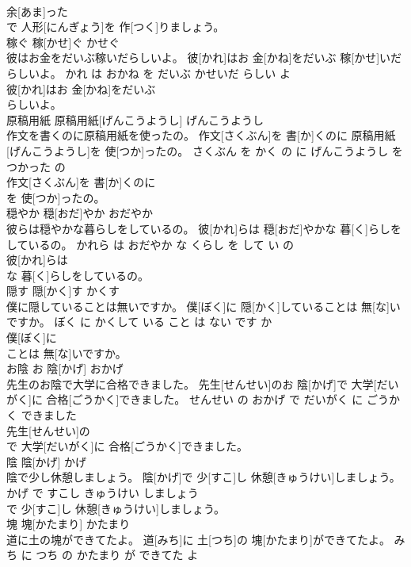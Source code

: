 \documentclass[8pt]{extreport}
\begin{document}
\begin{CJK}{UTF8}{min}
\\	余[あま]った
\\	で 人形[にんぎょう]を 作[つく]りましょう。			
\\	稼ぐ	稼[かせ]ぐ	かせぐ	
\\	彼はお金をだいぶ稼いだらしいよ。	彼[かれ]はお 金[かね]をだいぶ 稼[かせ]いだらしいよ。	かれ は おかね を だいぶ かせいだ らしい よ	
\\	彼[かれ]はお 金[かね]をだいぶ
\\	らしいよ。			
\\	原稿用紙	原稿用紙[げんこうようし]	げんこうようし	
\\	作文を書くのに原稿用紙を使ったの。	作文[さくぶん]を 書[か]くのに 原稿用紙[げんこうようし]を 使[つか]ったの。	さくぶん を かく の に げんこうようし を つかった の	
\\	作文[さくぶん]を 書[か]くのに
\\	を 使[つか]ったの。			
\\	穏やか	穏[おだ]やか	おだやか	
\\	彼らは穏やかな暮らしをしているの。	彼[かれ]らは 穏[おだ]やかな 暮[く]らしをしているの。	かれら は おだやか な くらし を して い の	
\\	彼[かれ]らは
\\	な 暮[く]らしをしているの。			
\\	隠す	隠[かく]す	かくす	
\\	僕に隠していることは無いですか。	僕[ぼく]に 隠[かく]していることは 無[な]いですか。	ぼく に かくして いる こと は ない です か	
\\	僕[ぼく]に
\\	ことは 無[な]いですか。			
\\	お陰	お 陰[かげ]	おかげ	
\\	先生のお陰で大学に合格できました。	先生[せんせい]のお 陰[かげ]で 大学[だいがく]に 合格[ごうかく]できました。	せんせい の おかげ で だいがく に ごうかく できました	
\\	先生[せんせい]の
\\	で 大学[だいがく]に 合格[ごうかく]できました。			
\\	陰	陰[かげ]	かげ	
\\	陰で少し休憩しましょう。	陰[かげ]で 少[すこ]し 休憩[きゅうけい]しましょう。	かげ で すこし きゅうけい しましょう	
\\	で 少[すこ]し 休憩[きゅうけい]しましょう。			
\\	塊	塊[かたまり]	かたまり	
\\	道に土の塊ができてたよ。	道[みち]に 土[つち]の 塊[かたまり]ができてたよ。	みち に つち の かたまり が できてた よ	

\end{CJK}
\end{document}
